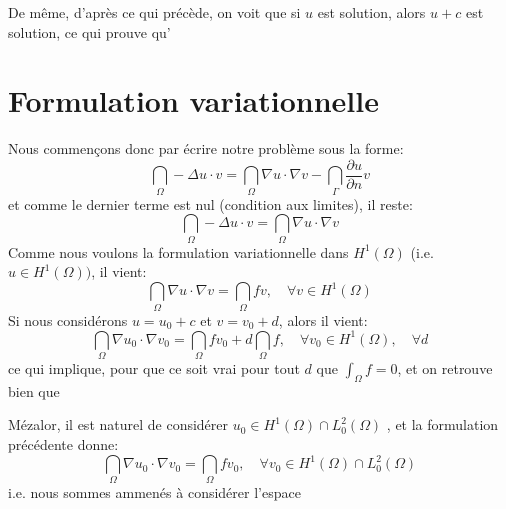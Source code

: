 De même, d'après ce qui précède, on voit que si $u$ est solution, alors
$u+c$ est solution, ce qui prouve qu'

\medskip
\section{Formulation variationnelle}

\medskip
Nous commençons donc par écrire notre problème sous la forme:
\begin{equation}
\dint_\Omega -\Delta u\cdot v = \dint_\Omega \nabla u\cdot \nabla v - \dint_\Gamma \frac{\partial u}{\partial n} v
\end{equation}
et comme le dernier terme est nul (condition aux limites), il reste:
\begin{equation}
\dint_\Omega -\Delta u\cdot v = \dint_\Omega \nabla u\cdot \nabla v
\end{equation}
Comme nous voulons la formulation variationnelle dans $H^1(\Omega)$ (i.e. $u\in H^1(\Omega))$, il vient:
\begin{equation}
\dint_\Omega \nabla u\cdot \nabla v = \dint_\Omega f v, \quad \forall v\in H^1(\Omega)
\end{equation}
\medskip
Si nous considérons $u=u_0+c$ et $v=v_0+d$, alors il vient:
\begin{equation}
\dint_\Omega \nabla u_0\cdot\nabla v_0 = \dint_\Omega f v_0 + d\dint_\Omega f, \quad \forall v_0\in H^1(\Omega),\quad \forall d
\end{equation}
ce qui implique, pour que ce soit vrai pour tout $d$ que $\int_\Omega f=0$, et on retrouve
bien que 

\medskip
Mézalor, il est naturel de considérer $u_0\in H^1(\Omega)\cap L^2_0(\Omega)$ , et
la formulation précédente donne:
\begin{equation}
\dint_\Omega \nabla u_0\cdot\nabla v_0 = \dint_\Omega f v_0,
\quad \forall v_0\in H^1(\Omega)\cap L^2_0(\Omega)
\end{equation}
i.e. nous sommes ammenés à considérer l'espace 


